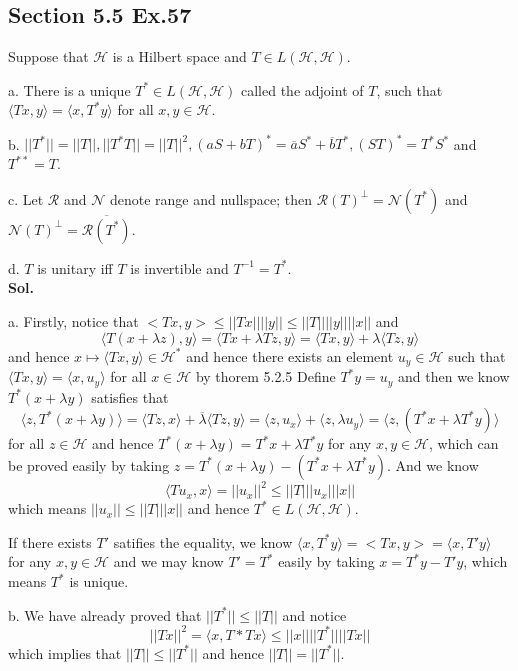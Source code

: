 \documentclass[lang=en,11pt,a4paper,citestyle =authoryear]{elegantpaper}
\newcommand{\Hil}{\mathcal{H}}
\begin{document}
\subsection*{Section 5.5 Ex.57} 
Suppose that $\Hil$ is a Hilbert space and $T\in L(\Hil,\Hil)$.\par
a. There is a unique $T^* \in L(\Hil,\Hil)$ called the adjoint of $T$, such that $\langle Tx,y\rangle = \langle x, T^*y\rangle$ for all $x,y\in\Hil$.\par
b. $||T^*|| = ||T||, ||T^*T|| = ||T||^2, (aS+bT)^* = \overline{a}S^* + \overline{b}T^{*}, (ST)^* = T^*S^*$ and $T^{**} = T$.\par
c. Let $\mathcal{R}$ and $\mathcal{N}$ denote range and nullspace; then $\mathcal{R}(T)^{\perp} = \mathcal{N}(T^*)$ and $\mathcal{N}(T)^{\perp} = \overline{\mathcal{R}(T^*)}$.\par
d. $T$ is unitary iff $T$ is invertible and $T^{-1} = T^*$.
\vspace{0.5em}\\
\textbf{Sol.} \par
a. Firstly, notice that $<Tx,y>\leq ||Tx||||y|| \leq ||T||||y||||x||$ and
\[\langle T(x+\lambda z), y\rangle = \langle Tx+\lambda Tz, y\rangle = \langle Tx,y\rangle + \lambda \langle Tz,y\rangle\]
and hence $x\mapsto \langle Tx,y\rangle \in \Hil^*$ and hence there exists an element $u_y \in \Hil$ such that $\langle Tx, y\rangle = \langle x, u_y\rangle$ for all $x\in \Hil$ by thorem 5.2.5 Define $T^* y = u_y$ and then we know $T^* (x+\lambda y)$ satisfies that
\[\langle z, T^*(x+\lambda y)\rangle = \langle Tz,x\rangle + \overline{\lambda}\langle Tz,y\rangle = \langle z,u_x\rangle + \langle z,\lambda u_y\rangle = \langle z,(T^*x+\lambda T^* y)\rangle\]
for all $z\in \Hil$ and hence $T^*(x+\lambda y) = T^*x+\lambda T^*y$ for any $x,y\in\Hil$, which can be proved easily by taking $z = T^*(x+\lambda y)-(T^*x+\lambda T^*y)$. And we know
\[\langle Tu_x,x\rangle = ||u_x||^2 \leq ||T|||u_x|||x||\]
which means $||u_x|| \leq ||T|||x||$ and hence $T^* \in L(\Hil,\Hil)$.\par
If there exists $T'$ satifies the equality, we know $\langle x, T^* y\rangle = <Tx , y> = \langle x, T' y\rangle$ for any $x,y\in\Hil$ and we may know $T'=T^*$ easily by taking $x = T^*y-T'y$, which means $T^*$ is unique.\par
b. We have already proved that $||T^*|| \leq ||T||$ and notice
\[||Tx||^2 = \langle x,T*Tx\rangle \leq ||x||||T^*||||Tx|| \]
which implies that $||T||\leq ||T^*||$ and hence $||T||=||T^*||$.\par
\end{document}
